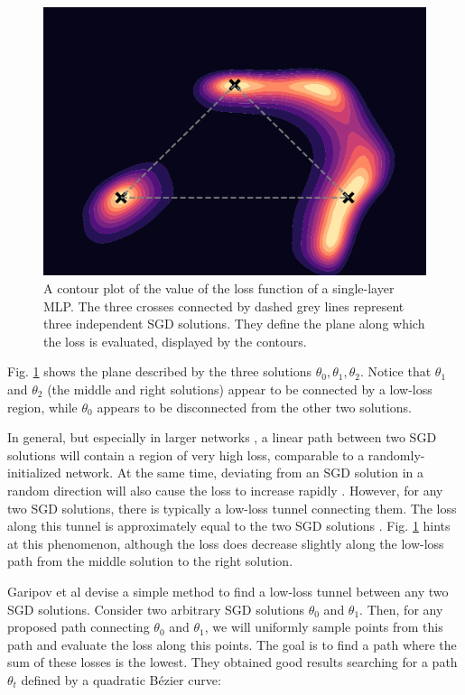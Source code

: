 \documentclass[12pt]{article}
\begin{document}
\begin{figure}[H]
\centering
\includegraphics[width=12cm]{plots/loss_landscape.pdf}
\caption{A contour plot of the value of the loss function of a single-layer MLP. The three crosses connected by dashed grey lines represent three independent SGD solutions. They define the plane along which the loss is evaluated, displayed by the contours.}
\label{fig_loss_landscape}
\end{figure}

Fig. \ref{fig_loss_landscape} shows the plane described by the three solutions $\theta_0, \theta_1, \theta_2$. Notice that $\theta_1$ and $\theta_2$ (the middle and right solutions) appear to be connected by a low-loss region, while $\theta_0$ appears to be disconnected from the other two solutions.

In general, but especially in larger networks \cite{mode_connectivity}, a linear path between two SGD solutions will contain a region of very high loss, comparable to a randomly-initialized network. At the same time, deviating from an SGD solution in a random direction will also cause the loss to increase rapidly \cite{swag}. However, for any two SGD solutions, there is typically a low-loss tunnel connecting them. The loss along this tunnel is approximately equal to the two SGD solutions \cite{mode_connectivity}. Fig. \ref{fig_loss_landscape} hints at this phenomenon, although the loss does decrease slightly along the low-loss path from the middle solution to the right solution.

Garipov et al \cite{mode_connectivity} devise a simple method to find a low-loss tunnel between any two SGD solutions. Consider two arbitrary SGD solutions $\theta_0$ and $\theta_1$. Then, for any proposed path connecting $\theta_0$ and $\theta_1$, we will uniformly sample points from this path and evaluate the loss along this points. The goal is to find a path where the sum of these losses is the lowest. They obtained good results searching for a path $\theta_t$ defined by a quadratic Bézier curve:
\end{document}
